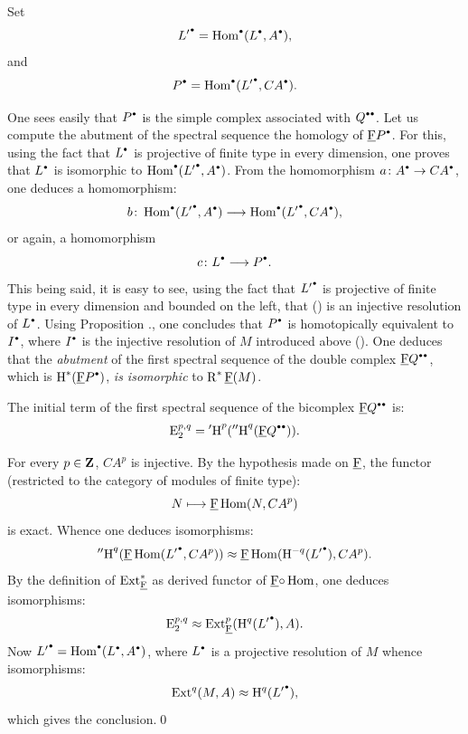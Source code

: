 Set
\begin{equation} \label{eq:VIII.1.3} {L'}^\boule=\Hom^\boule(L^\boule, A^\boule),
\end{equation}
and
\begin{equation} \label{eq:VIII.1.4} P^\boule=\Hom^\boule({L'}^\boule, CA^\boule).
\end{equation}

One sees easily that $P^\boule$ is the simple complex associated with $Q^{\boule\boule}$. Let us compute the abutment of the spectral sequence \ie the homology of ${\cF}P^\boule$. For this, using the fact that $L^\boule$ is projective of finite type in every dimension, one proves that $L^\boule$ is isomorphic to $\Hom^\boule({L'}^\boule, A^\boule)$. From the homomorphism $a\colon A^\boule\to CA^\boule$, one deduces a homomorphism:
\[b\colon \Hom^\boule({L'}^\boule, A^\boule)\to \Hom^\boule({L'}^\boule, CA^\boule), \]
or again, a homomorphism
\begin{equation} \label{eq:VIII.1.5} c\colon L^\boule\to P^\boule.
\end{equation}
This being said, it is easy to see, using the fact that ${L'}^\boule$ is projective of finite type in every dimension and bounded on the left, that () is an injective resolution of $L^\boule$. Using Proposition ., one concludes that $P^\boule$ is homotopically equivalent to $I^\boule$, where $I^\boule$ is the injective resolution of $M$ introduced above (). One deduces that the \emph{abutment} of the first spectral sequence of the double complex ${\cF}Q^{\boule\boule}$, which is $\H^\ast({\cF}P^\boule)$, \emph{is isomorphic} to $\operatorname{R}^\ast {\underline{\mathrm{F}}}(M)$.

The initial term of the first spectral sequence of the bicomplex ${\cF}Q^{\boule\boule}$ is:
\[
\E^{p, q}_2 = {'\!\H}^p({''\!\H}^q({\cF}Q^{\boule\boule})).
\]

For every $p\in\mathbf{Z}$, $CA^p$ is injective. By the hypothesis made on ${\underline{\mathrm{F}}}$, the functor (restricted to the category of modules of finite type):
\[
N \mto {\cF}\Hom(N, CA^p)\]
is exact. Whence one deduces isomorphisms:
\[
{''\!\H}^q({\cF}\Hom({L'}^\boule, CA^p))\approx {\cF}\Hom(\H^{-q}({L'}^\boule), CA^p).
\]
By the definition of $\operatorname{Ext}^\ast_{{\underline{\mathrm{F}}}}$ as derived functor of ${\underline{\mathrm{F}}}{\circ}\operatorname{Hom}$, one deduces isomorphisms:
\[
\E^{p, q}_2 \approx \Ext^p_{{\cF}}(\H^q({L'}^\boule), A).
\]
Now ${L'}^\boule=\Hom^\boule(L^\boule, A^\boule)$, where $L^\boule$ is a projective resolution of $M$ whence isomorphisms:
\[
\Ext^{q}(M, A)\approx \H^q({L'}^\boule),
\]
which gives the conclusion.\qed
